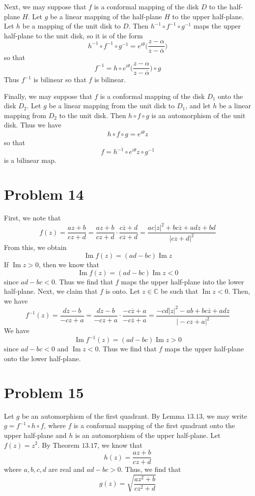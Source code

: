 \documentclass[12pt]{article}
\newcommand{\cc}{{\mathbb C}}
\DeclareMathOperator{\imag}{Im}
\begin{document}
Next, we may suppose that $f$ is a conformal mapping of the disk $D$ to the half-plane $H$. Let $g$ be a linear mapping of the half-plane $H$ to the upper half-plane. Let $h$ be a mapping of the unit disk to $D$. Then $h^{-1} \circ f^{-1} \circ g^{-1}$ maps the upper half-plane to the unit disk, so it is of the form
\[
h^{-1} \circ f^{-1} \circ g^{-1} = e^{i\theta} \bigg(\frac{z-\alpha}{z-\overline{\alpha}}\bigg)
\] so that
\[
f^{-1} = h \circ e^{i\theta} \bigg(\frac{z-\alpha}{z-\overline{\alpha}}\bigg) \circ g
\] Thus $f^{-1}$ is bilinear so that $f$ is bilinear.

Finally, we may suppose that $f$ is a conformal mapping of the disk $D_1$ onto the disk $D_2$. Let $g$ be a linear mapping from the unit disk to $D_1$, and let $h$ be a linear mapping from $D_2$ to the unit disk. Then $h \circ f \circ g$ is an automorphism of the unit disk. Thus we have
\[
h \circ f \circ g = e^{i\theta}z
\] so that
\[
f = h^{-1} \circ e^{i\theta} z \circ g^{-1}
\] is a bilinear map.
\newpage
\section*{Problem 14}
First, we note that
\[
f(z) = \frac{az+b}{cz+d} = \frac{az+b}{cz+d} \cdot \frac{c \overline{z} + d}{c \overline{z} + d} = \frac{ac \vert z \vert^2 + bc \overline{z} + adz + bd}{\vert cz + d \vert^2}
\] From this, we obtain
\[
\imag f(z) = (ad - bc) \imag z
\] If $\imag z > 0$, then we know that
\[
\imag f(z) = (ad - bc) \imag z < 0
\] since $ad - bc < 0$. Thus we find that $f$ maps the upper half-plane into the lower half-plane. Next, we claim that $f$ is onto. Let $z \in \cc$ be such that $\imag z < 0$. Then, we have
\[
f^{-1}(z) = \frac{dz-b}{-cz+a} = \frac{dz-b}{-cz+a} \cdot \frac{-c\overline{z}+a}{-c\overline{z}+a} = \frac{-cd\vert z\vert^2 - ab + bc\overline{z} + adz}{\vert - cz + a \vert^2}
\] We have
\[
\imag f^{-1}(z) = (ad - bc) \imag z > 0 
\] since $ad - bc < 0$ and $\imag z < 0$. Thus we find that $f$ maps the upper half-plane onto the lower half-plane.
\newpage
\section*{Problem 15}
Let $g$ be an automorphism of the first quadrant. By Lemma $13.13$, we may write $g = f^{-1} \circ h \circ f$, where $f$ is a conformal mapping of the first quadrant onto the upper half-plane and $h$ is an automorphism of the upper half-plane. Let $f(z) = z^2$. By Theorem $13.17$, we know that
\[
h(z) = \frac{az+b}{cz+d}
\] where $a,b,c,d$ are real and $ad-bc > 0$. Thus, we find that
\[
g(z) = \sqrt{\frac{az^2+b}{cz^2+d}}
\]
\newpage
\end{document}
